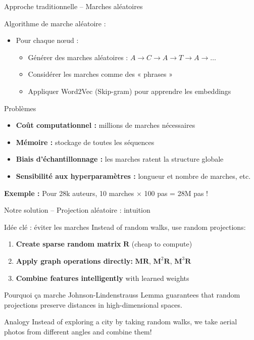 \documentclass[9pt,aspectratio=169,professionalfonts]{beamer}
\begin{document}
\begin{frame}{Approche traditionnelle – Marches aléatoires}
\begin{block}{Algorithme de marche aléatoire :}
\begin{itemize}
    \item Pour chaque nœud :
    \begin{itemize}
        \item Générer des marches aléatoires : $A \rightarrow C \rightarrow A \rightarrow T \rightarrow A \rightarrow \ldots$
        \item Considérer les marches comme des « phrases »
        \item Appliquer Word2Vec (Skip-gram) pour apprendre les embeddings
    \end{itemize}
\end{itemize}
\end{block}

\begin{alertblock}{Problèmes}
\begin{itemize}
    \item \textbf{Coût computationnel :} millions de marches nécessaires
    \item \textbf{Mémoire :} stockage de toutes les séquences
    \item \textbf{Biais d'échantillonnage :} les marches ratent la structure globale
    \item \textbf{Sensibilité aux hyperparamètres :} longueur et nombre de marches, etc.
\end{itemize}
\end{alertblock}

\textbf{Exemple :} Pour 28k auteurs, 10 marches \(\times\) 100 pas = 28M pas !
\end{frame}

\begin{frame}{Notre solution – Projection aléatoire : intuition}
\begin{block}{Idée clé : éviter les marches}
Instead of random walks, use random projections:
\begin{enumerate}
    \item \textbf{Create sparse random matrix} $\mathbf{R}$ (cheap to compute)
    \item \textbf{Apply graph operations directly:} $\mathbf{M} \mathbf{R}$, $\mathbf{M}^2 \mathbf{R}$, $\mathbf{M}^3 \mathbf{R}$
    \item \textbf{Combine features intelligently} with learned weights
\end{enumerate}
\end{block}

\begin{block}{Pourquoi ça marche}
Johnson-Lindenstrauss Lemma guarantees that random projections preserve distances in high-dimensional spaces.
\end{block}

\begin{exampleblock}{Analogy}
Instead of exploring a city by taking random walks, we take aerial photos from different angles and combine them!
\end{exampleblock}
\end{frame}
\end{document}
